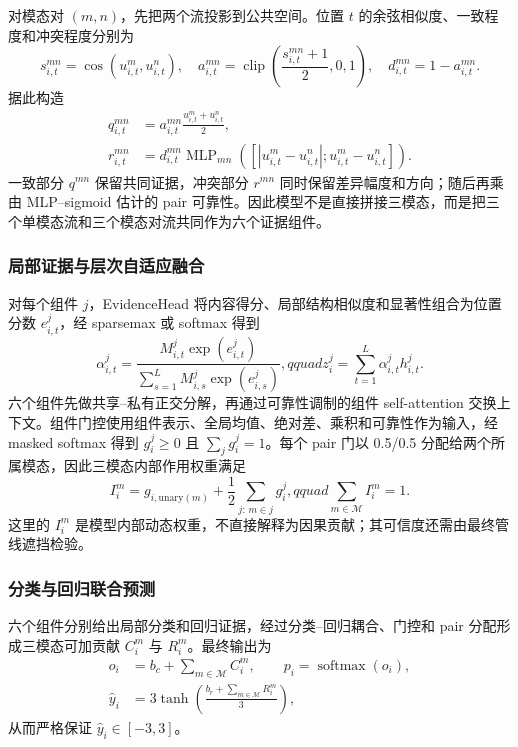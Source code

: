 对模态对 \((m,n)\)，先把两个流投影到公共空间。位置 \(t\) 的余弦相似度、一致程度和冲突程度分别为
\begin{equation}
s_{i,t}^{mn}=\cos(u_{i,t}^m,u_{i,t}^n),\quad
a_{i,t}^{mn}=\operatorname{clip}\!\left(\frac{s_{i,t}^{mn}+1}{2},0,1\right),\quad
d_{i,t}^{mn}=1-a_{i,t}^{mn}.
\label{eq:q3_conflict}
\end{equation}
据此构造
\begin{align}
q_{i,t}^{mn}&=a_{i,t}^{mn}\frac{u_{i,t}^m+u_{i,t}^n}{2},\\
r_{i,t}^{mn}&=d_{i,t}^{mn}\operatorname{MLP}_{mn}
\left([|u_{i,t}^m-u_{i,t}^n|;u_{i,t}^m-u_{i,t}^n]\right).
\label{eq:q3_pair}
\end{align}
一致部分 \(q^{mn}\) 保留共同证据，冲突部分 \(r^{mn}\) 同时保留差异幅度和方向；随后再乘由 MLP--sigmoid 估计的 pair 可靠性。因此模型不是直接拼接三模态，而是把三个单模态流和三个模态对流共同作为六个证据组件。

\subsubsection{局部证据与层次自适应融合}

对每个组件 \(j\)，EvidenceHead 将内容得分、局部结构相似度和显著性组合为位置分数 \(e_{i,t}^{j}\)，经 sparsemax 或 softmax 得到
\begin{equation}
\alpha_{i,t}^{j}=
\frac{M_{i,t}^{j}\exp(e_{i,t}^{j})}
{\sum_{s=1}^{L}M_{i,s}^{j}\exp(e_{i,s}^{j})},qquad
z_i^j=\sum_{t=1}^{L}\alpha_{i,t}^{j}h_{i,t}^{j}.
\label{eq:q3_local_pool}
\end{equation}
六个组件先做共享--私有正交分解，再通过可靠性调制的组件 self-attention 交换上下文。组件门控使用组件表示、全局均值、绝对差、乘积和可靠性作为输入，经 masked softmax 得到 \(g_i^j\ge0\) 且 \(\sum_jg_i^j=1\)。每个 pair 门以 0.5/0.5 分配给两个所属模态，因此三模态内部作用权重满足
\begin{equation}
I_i^m=g_{i,\mathrm{unary}(m)}+
\frac12\sum_{j:\,m\in j}g_i^j,qquad
\sum_{m\in\mathcal M}I_i^m=1.
\label{eq:q3_modality_gate}
\end{equation}
这里的 \(I_i^m\) 是模型内部动态权重，不直接解释为因果贡献；其可信度还需由最终管线遮挡检验。

\subsubsection{分类与回归联合预测}

六个组件分别给出局部分类和回归证据，经过分类--回归耦合、门控和 pair 分配形成三模态可加贡献 \(C_i^m\) 与 \(R_i^m\)。最终输出为
\begin{align}
o_i&=b_c+\sum_{m\in\mathcal M}C_i^m,\qquad
p_i=\operatorname{softmax}(o_i),\\
\hat y_i&=3\tanh\!\left(\frac{b_r+\sum_{m\in\mathcal M}R_i^m}{3}\right),
\label{eq:q3_prediction}
\end{align}
从而严格保证 \(\hat y_i\in[-3,3]\)。

